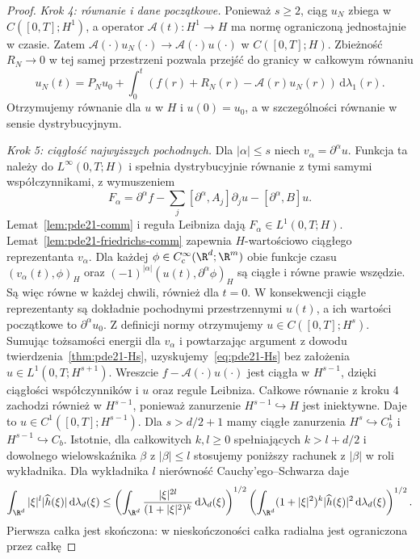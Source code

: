 \begin{proof}
\emph{Krok 4: równanie i dane początkowe.}
Ponieważ $s\ge2$, ciąg $u_N$ zbiega w
$C([0,T];H^1)$, a operator $\mathcal A(t):H^1\to H$
ma normę ograniczoną jednostajnie w czasie.
Zatem $\mathcal A(\cdot)u_N(\cdot)\to
\mathcal A(\cdot)u(\cdot)$ w $C([0,T];H)$.
Zbieżność $R_N\to0$ w tej samej przestrzeni
pozwala przejść do granicy w całkowym równaniu
\[
 u_N(t)=P_Nu_0+\int_0^t
 (f(r)+R_N(r)-\mathcal A(r)u_N(r))\,\mathrm d\lambda_1(r).
\]
Otrzymujemy równanie dla $u$ w $H$ i $u(0)=u_0$,
a w szczególności równanie w sensie dystrybucyjnym.

\emph{Krok 5: ciągłość najwyższych pochodnych.}
Dla $|\alpha|\le s$ niech $v_\alpha=\partial^\alpha u$.
Funkcja ta należy do $L^\infty(0,T;H)$ i spełnia
dystrybucyjnie równanie z tymi samymi współczynnikami,
z wymuszeniem
\[
 F_\alpha=\partial^\alpha f
 -\sum_j[\partial^\alpha,A_j]\partial_ju
 -[\partial^\alpha,B]u.
\]
Lemat~\ref{lem:pde21-comm} i reguła Leibniza dają
$F_\alpha\in L^1(0,T;H)$.
Lemat~\ref{lem:pde21-friedrichs-comm} zapewnia
$H$-wartościowo ciągłego reprezentanta $v_\alpha$.
Dla każdej $\phi\in C_c^\infty(\R^d;\R^m)$
obie funkcje czasu
$(v_\alpha(t),\phi)_H$ oraz
$(-1)^{|\alpha|}(u(t),\partial^\alpha\phi)_H$
są ciągłe i równe prawie wszędzie.
Są więc równe w każdej chwili, również dla $t=0$.
W konsekwencji ciągłe reprezentanty są dokładnie
pochodnymi przestrzennymi $u(t)$, a ich wartości
początkowe to $\partial^\alpha u_0$.
Z definicji normy otrzymujemy $u\in C([0,T];H^s)$.
Sumując tożsamości energii dla $v_\alpha$ i powtarzając
argument z dowodu twierdzenia~\ref{thm:pde21-Hs},
uzyskujemy~\eqref{eq:pde21-Hs} bez założenia
$u\in L^1(0,T;H^{s+1})$.
Wreszcie $f-\mathcal A(\cdot)u(\cdot)$ jest ciągła
w $H^{s-1}$, dzięki ciągłości współczynników i $u$
oraz regule Leibniza. Całkowe równanie z kroku 4
zachodzi również w $H^{s-1}$, ponieważ zanurzenie
$H^{s-1}\hookrightarrow H$ jest iniektywne.
Daje to $u\in C^1([0,T];H^{s-1})$.
Dla $s>d/2+1$ mamy ciągłe zanurzenia
$H^s\hookrightarrow C_b^1$ i $H^{s-1}\hookrightarrow C_b$.
Istotnie, dla całkowitych $k,l\ge0$ spełniających
$k>l+d/2$ i dowolnego wielowskaźnika $\beta$
z $|\beta|\le l$ stosujemy poniższy rachunek
z $|\beta|$ w roli wykładnika. Dla wykładnika
$l$ nierówność Cauchy'ego--Schwarza daje
\[
 \int_{\R^d}|\xi|^l|\widehat h(\xi)|\,\mathrm d\lambda_d(\xi)
 \le
 \left(\int_{\R^d}\frac{|\xi|^{2l}}{(1+|\xi|^2)^k}
 \,\mathrm d\lambda_d(\xi)\right)^{1/2}
 \left(\int_{\R^d}(1+|\xi|^2)^k|\widehat h(\xi)|^2
 \,\mathrm d\lambda_d(\xi)\right)^{1/2}.
\]
Pierwsza całka jest skończona: w nieskończoności
całka radialna jest ograniczona przez całkę

\end{proof}

